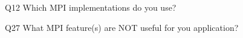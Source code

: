 \begin{description}%
\item{Q12} Which MPI implementations do you use?%
\item{Q27} What MPI feature(s) are NOT useful for you application?%
\end{description}%
